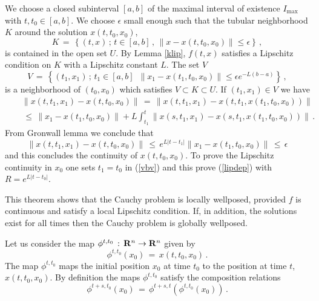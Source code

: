 \documentclass[12pt]{report}
\newcommand{\bR}{{\bf R}}
\newcommand{\proof}{\noindent {\em Proof:~}}
\newcommand{\nn}{\nonumber}
\def\eqref#1{(\ref{#1})}
\def\qed{\hbox{\hskip 6pt\vrule width6pt height7pt depth1pt
    \hskip1pt}\bigskip}
\def\to{\rightarrow}
\begin{document}
\proof We choose a closed subinterval $[a,b]$ of the maximal interval 
of existence $I_{\max}$ with $t, t_0 \in [a,b]$.  We choose $\epsilon$ small enough such
that the tubular neighborhood $K$ around the solution $x(t,t_0,x_0)$, 
\begin{equation}
K\,=\, \left\{ (t,x)\,;\, t \in [a,b]\,,\, \|x - x(t,t_0,x_0)\| \le
\epsilon \right\} \,,
\end{equation}
is contained in the open set $U$. By Lemma \ref{klip}, $f(t,x)$
satisfies a Lipschitz condition on $K$ with a Lipschitz constant $L$.
The set $V$
\begin{equation}
V\,=\, \left\{ (t_1,x_1)\,;\, t_1 \in [a,b]\,\,\, \|x_1 -
x(t_1,t_0,x_0)\| \le \epsilon e^{-L(b-a)} \right\} \,,
\end{equation}
is a neighborhood of $(t_0,x_0)$ which satisfies $V \subset K \subset
U$.  If $(t_1,x_1)\in V$ we have
\begin{eqnarray} 
&&\left\| x(t, t_1, x_1) - x(t, t_0, x_0) \right\| \,=\, \left\| x(t,
t_1, x_1) - x(t, t_1, x(t_1, t_0, x_0)) \right\| \nn \\ && \,\le \,
\|x_1 - x(t_1, t_0, x_0)\| + L \int_{t_1}^t \| x(s, t_1, x_1) - x(s,
t_1, x(t_1, t_0, x_0)) \| \,.
\end{eqnarray}
From Gronwall lemma we conclude that 
\begin{equation}\label{vbv}
\left\| x(t, t_1, x_1) - x(t, t_0, x_0) \right\| \, \le \,
e^{L|t-t_1|} \|x_1 - x(t_1, t_0, x_0)\| \,\le\, \epsilon
\end{equation}
and this concludes the continuity of $x(t,t_0,x_0)$.  To prove the Lipschitz 
continuity in $x_0$ one sets $t_1=t_0$ in \eqref{vbv} and this prove \eqref{lipdep}
with $R= e^{L|t-t_0|}$.  \hfill \qed

This theorem shows that the Cauchy problem is locally wellposed,
provided $f$ is continuous and satisfy a local Lipschitz
condition. If, in addition, the solutions exist for all times then the
Cauchy problem is globally wellposed.



Let us consider the map
$\phi^{t,t_0}\,:\, \bR^n \to \bR^n$ given by
\begin{equation}                  
\phi^{t,t_0} (x_0) \,=\, x(t,t_0,x_0) \,.
\end{equation}
The map $\phi^{t,t_0}$ maps the initial position $x_0$ at time $t_0$
to the position at time $t$, $x(t,t_0,x_0)$.  By definition the maps
$\phi^{t,t_0}$ satisfy the composition relations
\begin{equation}
\phi^{t+s, t_0}(x_0) \,=\, \phi^{t+s, t}( \phi^{t, t_0}(x_0) ) \,.
\end{equation}
\end{document}
